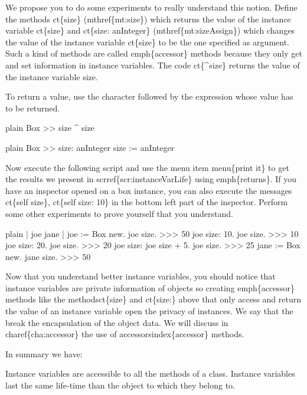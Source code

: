 \documentclass[10pt,twoside,english]{_support/latex/sbabook/sbabook}
\begin{document}
We propose you to do some experiments to really understand this notion. 
Define the methods ct\{size\} (mthref\{mt:size\}) which returns the value 
of the instance variable ct\{size\} and ct\{size: anInteger\} 
(mthref\{mt:sizeAssign\}) which changes the value of 
the instance variable ct\{size\} to be the one specified as argument. Such a kind of methods are called emph\{accessor\} methods because they only get and set information in instance variables. 
The code ct\{\string^size\} returns the value of the instance variable size.

\begin{note}
To return a value, use the character \textcode{\string^} followed by the expression whose value has to be returned.
\end{note}

\begin{displaycode}{plain}
Box >> size
   ^ size
\end{displaycode}

\begin{displaycode}{plain}
Box >> size: anInteger
   size := anInteger
\end{displaycode}

Now execute the following script and use the menu item menu\{print it\} to get the results we present in  scrref\{scr:instanceVarLife\} using emph\{returns\}. If you have an inspector opened on a box instance, you can also execute the messages ct\{self size\}, ct\{self size: 10\} in the bottom left part of the inspector. Perform some other experiments to prove yourself that you understand.

\begin{displaycode}{plain}
| joe jane |
joe := Box new.
joe size. 
>>> 50
joe size: 10.
joe size. 
>>> 10
joe size: 20.
joe size. 
>>> 20
joe size: joe size + 5.
joe size. 
>>> 25
jane := Box new.
jane size. 
>>> 50
\end{displaycode}

Now that you understand better instance variables, you should notice that instance variables are private information of objects so creating emph\{accessor\} methods like the methodsct\{size\} and ct\{size:\} above that only access and return the value of an instance variable open the privacy of instances. We say that the break the encapsulation of the object data. We will discuss in charef\{cha:accessor\} the use of accessorsindex\{accessor\} methods.

In summary we have: 

\begin{note}
Instance variables are accessible to all the methods of a class.  Instance variables last the same life-time than the object to which they belong to.
\end{note}
\end{document}
